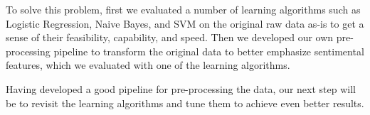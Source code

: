 To solve this problem, first we evaluated a number of learning algorithms
such as Logistic Regression, Naive Bayes, and SVM on the original
raw data as-is to get a sense of their feasibility, capability, and
speed. Then we developed our own pre-processing pipeline to transform
the original data to better emphasize sentimental features, which
we evaluated with one of the learning algorithms.

Having developed a good pipeline for pre-processing the data, our
next step will be to revisit the learning algorithms and tune them
to achieve even better results.

